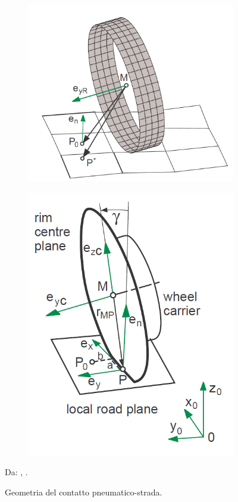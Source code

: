 \begin{figure}[h]
	\centering
	\begin{subfigure}{0.45\linewidth}
		\centering
		\includegraphics[width=\linewidth]{Figures/contact_geometry_1}
	\end{subfigure}
	\begin{subfigure}{0.35\linewidth}
		\centering
		\includegraphics[width=\linewidth]{Figures/contact_geometry_2}
	\end{subfigure}
	\caption{Geometria del contatto pneumatico-strada.}
	Da: \citeauthor{Rill}, .
	\label{contactgeometry}
\end{figure}

